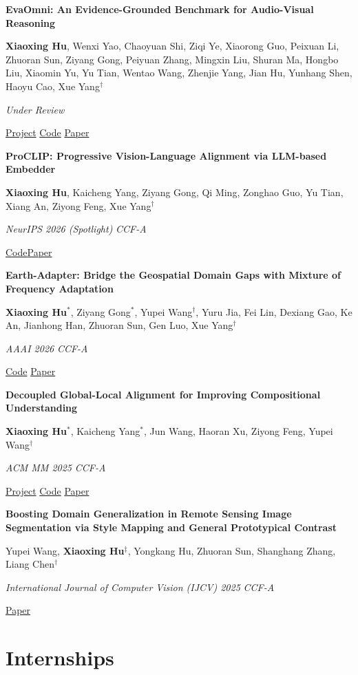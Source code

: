 \documentclass[a4paper,10.5pt]{article}
\let\oldSection\section
\renewcommand{\section}[1]{\needspace{5\baselineskip}\oldSection{#1}}
\newcommand{\pub}[4]{%
  \needspace{4\baselineskip}%
  \vspace{0.32em}%
  {\bfseries #1}\par\vspace{0.5pt}%
  {\small #2}\par\vspace{0.5pt}%
  {\small\itshape\color{accent}#3}\par\vspace{0.5pt}%
  {\footnotesize\color{muted}#4}\par
}
\newcommand{\sep}{\,\textperiodcentered\,}
\begin{document}
\pub{EvaOmni: An Evidence-Grounded Benchmark for Audio-Visual Reasoning}
  {\textbf{Xiaoxing Hu}, Wenxi Yao, Chaoyuan Shi, Ziqi Ye, Xiaorong Guo, Peixuan Li, Zhuoran Sun,
   Ziyang Gong, Peiyuan Zhang, Mingxin Liu, Shuran Ma, Hongbo Liu, Xiaomin Yu, Yu Tian, Wentao Wang,
   Zhenjie Yang, Jian Hu, Yunhang Shen, Haoyu Cao, Xue Yang$^{\dagger}$}
  {Under Review}
  {\href{https://xiaoxing2001.github.io/EvaOmni.github.io/}{Project}\quad
   \href{https://github.com/VisionXLab/EvaOmni}{Code}\quad
   \href{https://arxiv.org/abs/2610.28444}{Paper}}

\pub{ProCLIP: Progressive Vision-Language Alignment via LLM-based Embedder}
  {\textbf{Xiaoxing Hu}, Kaicheng Yang, Ziyang Gong, Qi Ming, Zonghao Guo, Yu Tian, Xiang An,
   Ziyong Feng, Xue Yang$^{\dagger}$}
  {NeurIPS 2026 (Spotlight)\sep CCF-A}
  {\href{https://github.com/VisionXLab/ProCLIP}{Code}\quad\href{https://arxiv.org/abs/2510.18795}{Paper}}

\pub{Earth-Adapter: Bridge the Geospatial Domain Gaps with Mixture of Frequency Adaptation}
  {\textbf{Xiaoxing Hu}$^{*}$, Ziyang Gong$^{*}$, Yupei Wang$^{\dagger}$, Yuru Jia, Fei Lin, Dexiang Gao, Ke An,
   Jianhong Han, Zhuoran Sun, Gen Luo, Xue Yang$^{\dagger}$}
  {AAAI 2026\sep CCF-A}
  {\href{https://github.com/VisionXLab/Earth-Adapter}{Code}\quad
   \href{https://arxiv.org/abs/2504.06220}{Paper}}

\pub{Decoupled Global-Local Alignment for Improving Compositional Understanding}
  {\textbf{Xiaoxing Hu}$^{*}$, Kaicheng Yang$^{*}$, Jun Wang, Haoran Xu, Ziyong Feng, Yupei Wang$^{\dagger}$}
  {ACM MM 2025\sep CCF-A}
  {\href{https://xiaoxing2001.github.io/DeGLA.github.io/}{Project}\quad
   \href{https://github.com/xiaoxing2001/DeGLA}{Code}\quad
   \href{https://arxiv.org/abs/2504.16801}{Paper}}

\pub{Boosting Domain Generalization in Remote Sensing Image Segmentation via Style Mapping and General Prototypical Contrast}
  {Yupei Wang, \textbf{Xiaoxing Hu}$^{\ddagger}$, Yongkang Hu, Zhuoran Sun, Shanghang Zhang, Liang Chen$^{\dagger}$}
  {International Journal of Computer Vision (IJCV) 2025\sep CCF-A}
  {\href{https://link.springer.com/article/10.1007/s11263-025-02568-3}{Paper}}

\section{Internships}
\end{document}
